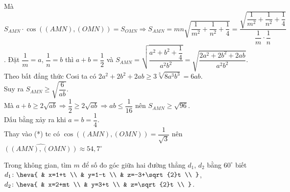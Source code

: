 \begin{ex}
{		Mà ${S_{AMN}}\cdot \cos\left( \left( AMN \right),\left( OMN \right) \right)={S_{OMN}}\Rightarrow {S_{AMN}}=mn\sqrt{\dfrac{1}{m^2}+\dfrac{1}{n^2}+\dfrac{1}{4}}=\dfrac{\sqrt{\dfrac{1}{m^2}+\dfrac{1}{n^2}+\dfrac{1}{4}}}{\dfrac{1}{m}\cdot\dfrac{1}{n}}$.
		Đặt $\dfrac{1}{m}=a$, $\dfrac{1}{n}=b$ thì $a+b=\dfrac{1}{2}$ và ${S_{AMN}}=\sqrt{\dfrac{a^2+b^2+\dfrac{1}{4}}{a^2b^2}}=\sqrt{\dfrac{2a^2+2b^2+2ab}{a^2{b^2}}}$.\\
		Theo bất đẳng thức Cosi ta có $2a^2+2b^2+2ab\ge 3\sqrt[3]{8a^3{b^3}}=6ab$.\\
		Suy ra ${S_{AMN}}\ge \sqrt{\dfrac{6}{ab}}$.\\ Mà $a+b\ge 2\sqrt{ab}\Rightarrow \dfrac{1}{2}\ge 2\sqrt{ab}\Rightarrow ab\le \dfrac{1}{16}$ nên ${S_{AMN}}\ge \sqrt{96}$.\\
		Dấu bằng xảy ra khi $a=b=\dfrac{1}{4}$.\\ Thay vào (*) tc có $\cos\left( \left( AMN \right),\left( OMN \right) \right)=\dfrac{1}{\sqrt{3}}$ nên $\widehat{\left( \left( AMN \right),\left( OMN \right) \right)}\approx 54,7^\circ$\\
	}
\end{ex}

\begin{ex}%
	Trong không gian, tìm $m$ để số đo góc giữa hai đường thẳng $d_1$, $d_2$ bằng $60^\circ$ biết $d_1\colon\heva{
		& x=1+t \\
		& y=1-t \\
		& z=-3+\sqrt{2}t \\
	}$, $d_2 \colon\heva{
		& x=2+mt \\
		& y=3+t \\
		& z=\sqrt{2}t \\
	}$.\\
\end{ex}

	
	



